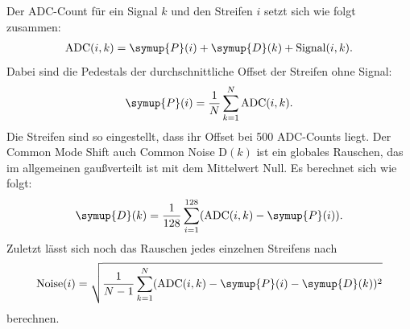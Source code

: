 Der ADC-Count für ein Signal $k$ und den Streifen $i$ setzt sich wie folgt zusammen:
\begin{align}
  \text{ADC}(i, k) = \symup{P}(i) + \symup{D}(k) + \text{Signal}(i, k).
\end{align}
Dabei sind die Pedestals der durchschnittliche Offset der Streifen ohne Signal:
\begin{align}
  \symup{P}(i) = \frac{1}{N} \sum_{k=1}^N \text{ADC}(i, k).
\end{align}
Die Streifen sind so eingestellt, dass ihr Offset bei \num{500} ADC-Counts liegt.
Der Common Mode Shift auch Common Noise D$(k)$ ist ein globales Rauschen, das im allgemeinen gaußverteilt ist mit dem Mittelwert Null. Es berechnet sich wie folgt:
\begin{align}
  \symup{D}(k) = \frac{1}{128} \sum_{i=1}^{128} (\text{ADC}(i, k) - \symup{P}(i)).
\end{align}
Zuletzt lässt sich noch das Rauschen jedes einzelnen Streifens nach
\begin{align}
  \text{Noise}(i) = \sqrt{\frac{1}{N-1} \sum_{k=1}^N(\text{ADC}(i, k) - \symup{P}(i) - \symup{D}(k))^2}
\end{align}
berechnen.

%
%
%
%
